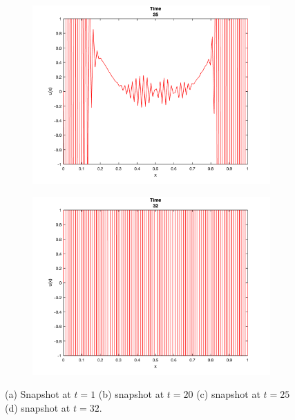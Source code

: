 \documentclass[12pt]{article}
\begin{document}
\begin{figure}[h!]
\medskip

\begin{subfigure}{0.49\columnwidth}
\centering
\includegraphics[width=\textwidth]{problem_3_t_25.png}
\caption{}
\label{fig:time3}
\end{subfigure}\hfill
\begin{subfigure}{0.49\columnwidth}
\centering
\includegraphics[width=\textwidth]{problem_3_t_32.png}
\caption{}
\label{fig:time4}
\end{subfigure}

\caption{(a) Snapshot at $t = 1$ (b) snapshot at $t = 20$ (c) snapshot at $t = 25$ (d) snapshot at $t = 32$.}
\label{fig:time}

\end{figure}
\end{document}
